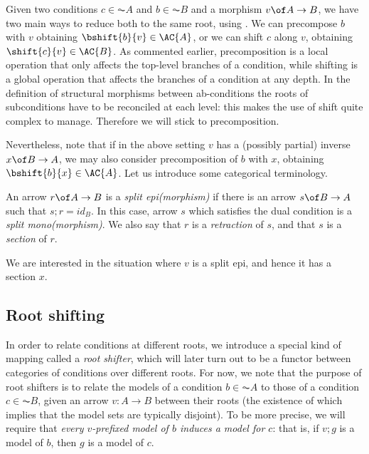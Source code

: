 Given two conditions $c\in \AC{A}$ and $b\in \AC{B}$ and a morphism $v\of A \to B$, we have two main ways to reduce both to the same root, using . We can precompose $b$ with $v$ obtaining $\bshift{b}{v}\in \AC{A}$, or we can shift $c$ along $v$, obtaining $\shift{c}{v}\in \AC{B}$. As commented earlier, precomposition is a local operation that only affects the top-level branches of a condition, while shifting is a global operation that affects the branches of a condition at any depth. In the definition of structural morphisms between ab-conditions the roots of subconditions have to be reconciled at each level: this makes the use of shift quite complex to manage. Therefore we will stick to precomposition. 

Nevertheless, note that if in the above setting $v$ has a (possibly partial) inverse $x\of B \to A$, we may also consider precomposition of $b$ with $x$, obtaining $\bshift{b}{x}\in \AC{A}$. Let us introduce some categorical terminology.

\begin{definition}
  An arrow $r\of A \to B$  is a \emph{split epi(morphism)} if there is an arrow $s\of B\to A$ such that $s;r = id_B$. In this case, arrow $s$ which satisfies the dual condition is a 
\emph{split mono(morphism)}. We also say that $r$ is a \emph{retraction} of $s$, and that $s$ is a \emph{section} of $r$.
\end{definition} 

We are interested in the situation where $v$ is a split epi, and hence it has a section $x$. 

\subsection{Root shifting}

In order to relate conditions at different roots, we introduce a special kind of mapping called a \emph{root shifter}, which will later turn out to be a functor between categories of conditions over different roots. For now, we note that the purpose of root shifters is to relate the models of a condition $b\in \AC A$ to those of a condition $c\in \AC B$, given an arrow $v:A\to B$ between their roots (the existence of which implies that the model sets are typically disjoint). To be more precise, we will require that \emph{every $v$-prefixed model of $b$ induces a model for $c$}: that is, if $v;g$ is a model of $b$, then $g$ is a model of $c$.

